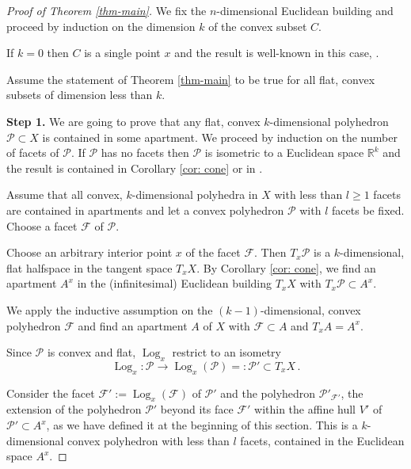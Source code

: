 \documentclass[12pt,leqno]{amsart}
\numberwithin{equation}{section}
\theoremstyle{definition}
\theoremstyle{remark}
\newcommand{\R}{\mathbb{R}}
\begin{document}
\begin{proof}[Proof of Theorem \ref{thm-main}]

We fix the $n$-dimensional Euclidean building 
and proceed by induction on the dimension $k$ of the convex subset $C$. 

   If $k=0$ then 
$C$ is a single point $x$ and the result is well-known in this case,  \cite[Lemma 4.2.3]{KleinerLeeb1}.


Assume  the statement of Theorem \ref{thm-main}  to be  true for all flat, convex subsets of dimension less than $k$. 

{\bf Step 1.}  We are going to prove that any flat, convex $k$-dimensional polyhedron $\mathcal P \subset X$ is contained in some apartment.  We proceed by induction  on the number of facets of $\mathcal P$.  If $\mathcal P$ has no facets then $\mathcal P$ is isometric to a Euclidean space $\R^k$ and the result is contained in Corollary \ref{cor: cone} or in \cite[Proposition 4.6.1]{KleinerLeeb1}. 



Assume that all convex, $k$-dimensional  polyhedra in $X$ with less than $l \geq 1$ facets  are contained in apartments and let a convex polyhedron $\mathcal P$ with $l$ facets  be fixed.    Choose a facet $\mathcal F$ of 
$\mathcal P$.

Choose an arbitrary interior point $x$ of the facet $\mathcal F$.  Then $T_x \mathcal P$ is a $k$-dimensional, flat halfspace  in the tangent space $T_xX$.  By  Corollary \ref{cor: cone}, we find an apartment $A^x$ in the (infinitesimal) Euclidean building $T_xX$ with $T_x \mathcal P \subset A^x$.

We apply the inductive assumption on the $(k-1)$-dimensional, convex polyhedron $\mathcal F$ and find an apartment $A$ of $X$ with $\mathcal F\subset A$ and  $ T_xA =A^x$.

Since $\mathcal P$ is convex and flat, $\operatorname{Log}_x$ restrict to an isometry 
$$\operatorname{Log}_x :\mathcal P \to \operatorname{Log}_x (\mathcal P)=: \mathcal P ' \subset T_xX\,.$$ 
 
 Consider the facet $\mathcal F':= \operatorname{Log}_x (\mathcal F)$ of $\mathcal P'$
 and  the polyhedron $\mathcal P'_{\mathcal F'}$, the   extension of the polyhedron $\mathcal P'$ beyond its face $\mathcal F'$ within the affine hull $V'$ of $\mathcal P' \subset A^x$, as we have defined it at the beginning of this section.  This is a $k$-dimensional convex polyhedron with less than $l$ facets, contained in the Euclidean space $A^x$.
 

\end{proof}
\end{document}
